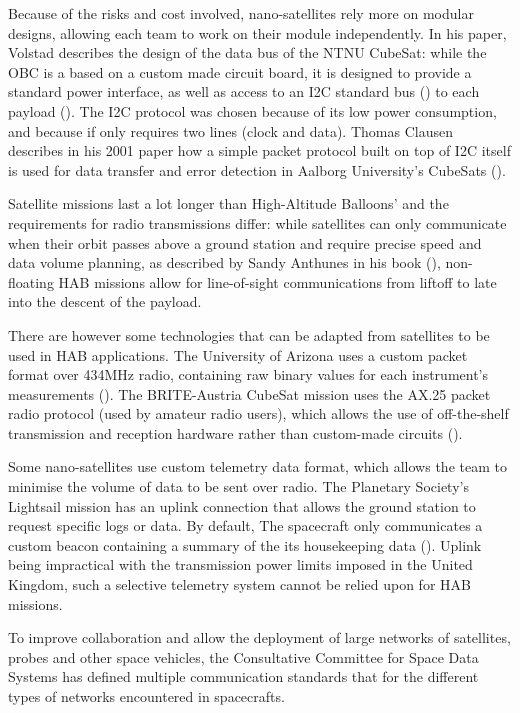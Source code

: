 Because of the risks and cost involved, nano-satellites rely more on modular
designs, allowing each team to work on their module independently. In his paper,
Volstad describes the design of the data bus of the NTNU CubeSat: while the OBC
is a based on a custom made circuit board, it is designed to provide a standard
power interface, as well as access to an I2C standard bus
(\cite{NXPSemiconductors2014}) to each payload (\cite{Volstad2011}). The I2C
protocol was chosen because of its low power consumption, and because if only
requires two lines (clock and data). Thomas Clausen describes in his 2001 paper
how a simple packet protocol built on top of I2C itself is used for data
transfer and error detection in Aalborg University's CubeSats
(\cite{Clausen2001}).

Satellite missions last a lot longer than High-Altitude Balloons' and the
requirements for radio transmissions differ: while satellites can only
communicate when their orbit passes above a ground station and require precise
speed and data volume planning, as described by Sandy Anthunes in his book
(\cite{Antunes2015}), non-floating HAB missions allow for line-of-sight
communications from liftoff to late into the descent of the payload.

There are however some technologies that can be adapted from satellites to be
used in HAB applications. The University of Arizona uses a custom packet format
over 434MHz radio, containing raw binary values for each instrument's
measurements (\cite{Eatchel2002}). The BRITE-Austria CubeSat mission uses the
AX.25 packet radio protocol (used by amateur radio users), which allows the
use of off-the-shelf transmission and reception hardware rather than custom-made
circuits (\cite{Traussnig2007}).

Some nano-satellites use custom telemetry data format, which allows the team
to minimise the volume of data to be sent over radio. The Planetary Society's
Lightsail mission has an uplink connection that allows the ground station
to request specific logs or data. By default, The spacecraft only communicates
a custom beacon containing a summary of the its housekeeping data
(\cite{planetary2016}). Uplink being impractical with the transmission power
limits imposed in the United Kingdom, such a selective telemetry system cannot
be relied upon for HAB missions.

To improve collaboration and allow the deployment of large networks of
satellites, probes and other space vehicles, the Consultative Committee for
Space Data Systems has defined multiple communication standards that for
the different types of networks encountered in spacecrafts.

